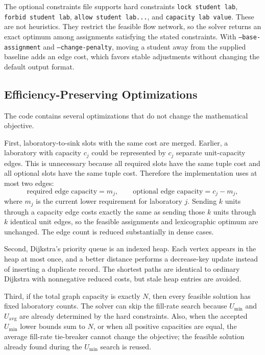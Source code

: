 \documentclass[11pt,a4paper]{article}
\begin{document}
The optional constraints file supports hard constraints
\texttt{lock student lab}, \texttt{forbid student lab},
\texttt{allow student lab...}, and \texttt{capacity lab value}.  These are not
heuristics.  They restrict the feasible flow network, so the solver returns an
exact optimum among assignments satisfying the stated constraints.  With
\texttt{--base-assignment} and \texttt{--change-penalty}, moving a student away
from the supplied baseline adds an edge cost, which favors stable adjustments
without changing the default output format.

\subsection{Efficiency-Preserving Optimizations}

The code contains several optimizations that do not change the mathematical
objective.

First, laboratory-to-sink slots with the same cost are merged.  Earlier, a
laboratory with capacity \(c_j\) could be represented by \(c_j\) separate
unit-capacity edges.  This is unnecessary because all required slots have the
same tuple cost and all optional slots have the same tuple cost.  Therefore
the implementation uses at most two edges:
\[
  \text{required edge capacity} = m_j,\qquad
  \text{optional edge capacity} = c_j-m_j,
\]
where \(m_j\) is the current lower requirement for laboratory \(j\).  Sending
\(k\) units through a capacity edge costs exactly the same as sending those
\(k\) units through \(k\) identical unit edges, so the feasible assignments
and lexicographic optimum are unchanged.  The edge count is reduced
substantially in dense cases.

Second, Dijkstra's priority queue is an indexed heap.  Each vertex appears in
the heap at most once, and a better distance performs a decrease-key update
instead of inserting a duplicate record.  The shortest paths are identical to
ordinary Dijkstra with nonnegative reduced costs, but stale heap entries are
avoided.

Third, if the total graph capacity is exactly \(N\), then every feasible
solution has fixed laboratory counts.  The solver can skip the fill-rate
search because \(U_{\min}\) and \(U_{\mathrm{avg}}\) are already determined by
the hard constraints.  Also, when the accepted \(U_{\min}\) lower bounds sum
to \(N\), or when all positive capacities are equal, the average fill-rate
tie-breaker cannot change the objective; the feasible solution already found
during the \(U_{\min}\) search is reused.
\end{document}
